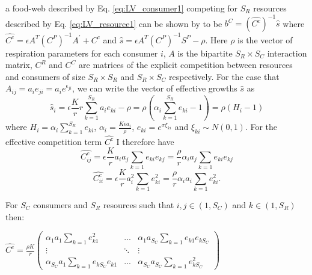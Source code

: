 \documentclass[a4paper]{report}
\begin{document}
a food-web described by Eq. \eqref{eq:LV_consumer1} competing for $S_{R}$
resources described by Eq. \eqref{eq:LV_resource1} can be shown by \citep{Rossberg2013}
to be $b^{C}=(\hat{C^{c}})^{-1}\hat{s}$ where $\hat{C^{c}}=\epsilon A^{T}(C^{P})^{-1}A^{'}+C^{c}$
and $\hat{s}=\epsilon A^{T}(C^{P})^{-1}S^{P}-\rho$. Here $\rho$ is the
vector of respiration parameters for each consumer $i$, $A$ is the
bipartite $S_{R}\times S_{C}$ interaction matrix, $C^{R}$ and $C^{C}$
are matrices of the explicit competition between resources and consumers
of size $S_{R}\times S_{R}$ and $S_{R}\times S_{C}$ respectively.
For the case that $A_{ij}=a_{i}e_{ji}=a_{i}e^{\epsilon_{ji}}$, we
can write the vector of effective growths $\hat{s}$ as
\begin{equation}
\hat{s}_{i}=\epsilon\frac{K}{r}r\sum_{k=1}^{S_{R}}a_{i}e_{ki}-\rho=\rho(\alpha_{i}\sum_{k=1}^{S_{R}}e_{ki}-1)=\rho(H_{i}-1)
\end{equation}
where $H_{i}=\alpha_{i}\sum_{k=1}^{S_{R}}e_{ki}$, $\alpha_{i}=\frac{K\epsilon a_{i}}{\rho}$,
$e_{ki}=e^{\sigma\xi_{ki}}$ and $\xi_{ki}\sim N(0,1)$. For the effective
competition term $\hat{C^{c}}$ I therefore have
\begin{equation}
\hat{C_{ij}^{c}}=\epsilon\frac{K}{r}a_{i}a_{j}\sum_{k=1}e_{ki}e_{kj}=\frac{\rho}{r}\alpha_{i}a_{j}\sum_{k=1}e_{ki}e_{kj} \label{eq:post_sem_def}
\end{equation}
\begin{equation}
\hat{C_{ii}^{c}}=\epsilon\frac{K}{r}a_{i}^{2}\sum_{k=1}e_{ki}^{2}=\frac{\rho}{r}\alpha_{i}a_{i}\sum_{k=1}e_{ki}^{2}.
\end{equation}

 For $S_{C}$ consumers and $S_{R}$ resources such that $i,j\in(1,S_{C})$
and $k\in(1,S_{R})$ then:\\

\begin{center}
$\hat{C^{c}}=\frac{\rho K}{r} \begin{pmatrix}
\alpha_{1}a_{1}\sum_{k=1}e_{k1}^{2} & ... & \alpha_{1}a_{S_{C}}\sum_{k=1}e_{k1}e_{kS_{C}} \\
\vdots & \ddots & \vdots \\
\alpha_{S_{C}}a_{1}\sum_{k=1}e_{kS_{C}}e_{k1} & ...& \alpha_{S_{C}}a_{S_{C}}\sum_{k=1}e_{kS_{C}}^{2}
\end{pmatrix}$
\end{center}
\end{document}
